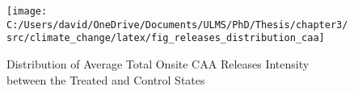 \begin{figure}[H]
    \centering
    \texttt{[image: C:/Users/david/OneDrive/Documents/ULMS/PhD/Thesis/chapter3/src/climate\_change/latex/fig\_releases\_distribution\_caa]}
    \caption{Distribution of Average Total Onsite CAA Releases Intensity between the Treated and Control States}
    \label{fig:releases-distribution-caa}
\end{figure}